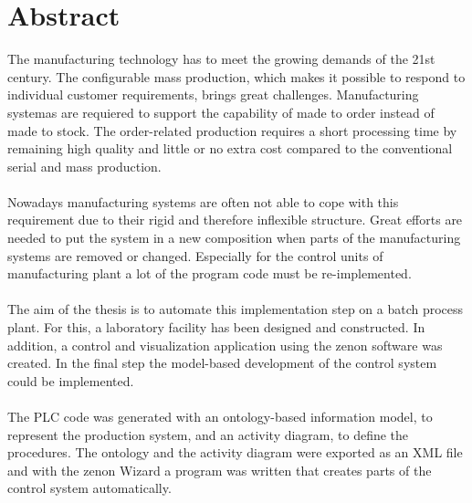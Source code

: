 \chapter*{Abstract}

The manufacturing technology has to meet the growing demands of the 21st century. The configurable mass production, which makes it possible to respond to individual customer requirements, brings great challenges. Manufacturing systemas are requiered to support the capability of made to order instead of made to stock. The order-related production requires a short processing time by remaining high quality and little or no extra cost compared to the conventional serial and mass production. \\\\
Nowadays manufacturing systems are often not able to cope with this requirement due to their rigid and therefore inflexible structure. Great efforts are needed to put the system in a new composition when parts of the manufacturing systems are removed or changed. Especially for the control units of manufacturing plant a lot of the program code must be re-implemented.\\\\
The aim of the thesis is to automate this implementation step on a batch process plant. For this, a laboratory facility has been designed and constructed. In addition, a control and visualization application using the zenon software was created. In the final step the model-based development of the control system could be implemented.\\\\
The PLC code was generated with an ontology-based information model, to represent the production system, and an activity diagram, to define the procedures. The ontology and the activity diagram were exported as an XML file and with the zenon Wizard a program was written that creates parts of the control system automatically.